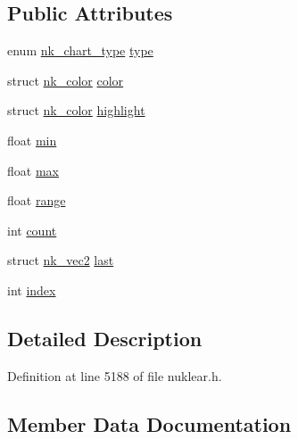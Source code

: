 \subsection*{Public Attributes}
\begin{DoxyCompactItemize}
\item 
enum \mbox{\hyperlink{nuklear_8h_a2685f2dbd5f80f76cbaebd524a12b7ef}{nk\+\_\+chart\+\_\+type}} \mbox{\hyperlink{structnk__chart__slot_a5ddac2544ff93ee695d262fb11274c27}{type}}
\item 
struct \mbox{\hyperlink{structnk__color}{nk\+\_\+color}} \mbox{\hyperlink{structnk__chart__slot_a0c316cc7cef54dd2f0857bf6f5108a28}{color}}
\item 
struct \mbox{\hyperlink{structnk__color}{nk\+\_\+color}} \mbox{\hyperlink{structnk__chart__slot_a0336ff329d36a3422aeec4c3009f02ce}{highlight}}
\item 
float \mbox{\hyperlink{structnk__chart__slot_ae7c42d9f745b91c73c838a6029c3380a}{min}}
\item 
float \mbox{\hyperlink{structnk__chart__slot_a58aa25a63cb64e32048c76ef309e77f1}{max}}
\item 
float \mbox{\hyperlink{structnk__chart__slot_a60431f77dd3aff82aba2b751034a8638}{range}}
\item 
int \mbox{\hyperlink{structnk__chart__slot_a0b700427a0a5f1431331629763476afb}{count}}
\item 
struct \mbox{\hyperlink{structnk__vec2}{nk\+\_\+vec2}} \mbox{\hyperlink{structnk__chart__slot_a2bd8d754537102846247d40483a97239}{last}}
\item 
int \mbox{\hyperlink{structnk__chart__slot_ae66e71dddf3f3811ebfd06a21c49157e}{index}}
\end{DoxyCompactItemize}


\subsection{Detailed Description}


Definition at line 5188 of file nuklear.\+h.



\subsection{Member Data Documentation}
\mbox{\label{structnk__chart__slot_a0c316cc7cef54dd2f0857bf6f5108a28}} 
